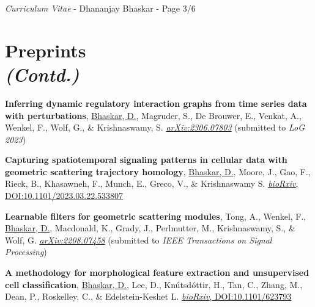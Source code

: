 \documentclass[margin,line]{res}
\begin{document}
\begin{resume}

\newpage
\begin{flushright}
\textit{Curriculum Vitae} - Dhananjay Bhaskar - Page 3/6
\end{flushright}
\vspace*{.02cm}

\section{\sc Preprints\\ \textit{(Contd.)}}
{
\renewcommand\leftmargini{0em}
\renewcommand{\labelenumi}{P\theenumi}
\begin{etaremune}[start=4]
\item{\bf Inferring dynamic regulatory interaction graphs from time series data with perturbations},
\underline{Bhaskar, D.}, Magruder, S., De Brouwer, E., Venkat, A., Wenkel, F., Wolf, G., \& Krishnaswamy, S.
\href{https://arxiv.org/abs/2306.07803}{\textit{arXiv:2306.07803}} (submitted to \textit{LoG 2023})
\vspace*{.1cm}
\item{\bf Capturing spatiotemporal signaling patterns in cellular data with geometric scattering trajectory homology},
\underline{Bhaskar, D.}, Moore, J., Gao, F., Rieck, B., Khasawneh, F., Munch, E., Greco, V., \& Krishnaswamy S.
\href{https://doi.org/10.1101/2023.03.22.533807}{\textit{bioRxiv}, DOI:10.1101/2023.03.22.533807}
\vspace*{.1cm}
\item{\bf Learnable filters for geometric scattering modules},
Tong, A., Wenkel, F., \underline{Bhaskar, D.}, Macdonald, K., Grady, J., Perlmutter, M., Krishnaswamy, S., \& Wolf, G.
\href{https://arxiv.org/abs/2208.07458}{\textit{arXiv:2208.07458}} (submitted to \textit{IEEE Transactions on Signal Processing})
\item{\bf A methodology for morphological feature extraction and unsupervised cell classification},
\underline{Bhaskar, D.}, Lee, D., Kn\'{u}tsd\'{o}ttir, H., Tan, C., Zhang, M., Dean, P., Roskelley, C., \& Edelstein-Keshet L.
\href{https://www.biorxiv.org/content/10.1101/623793v1.abstract}{\textit{bioRxiv}, DOI:10.1101/623793}
\end{etaremune}
}


\end{resume}
\end{document}
